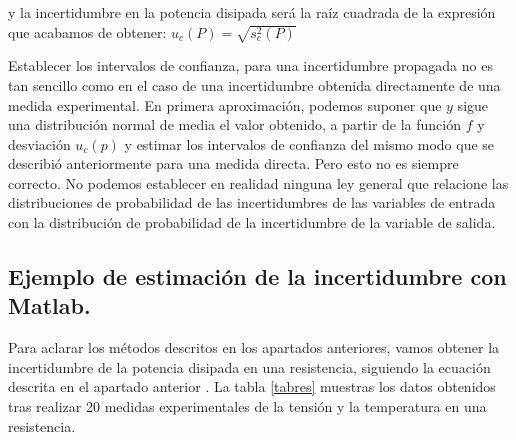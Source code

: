 y la incertidumbre en la potencia disipada será la raíz cuadrada de la expresión que acabamos de obtener: $u_c(P) =\sqrt{s_c^2(P)} $

Establecer los intervalos de confianza, para una incertidumbre propagada no es tan sencillo como en el caso de una incertidumbre obtenida directamente de una medida experimental. En primera aproximación, podemos suponer que $y$ sigue una distribución normal de media el valor obtenido, a partir de la función $f$ y desviación $u_c(p)$ y estimar los intervalos de confianza del mismo modo que se describió anteriormente para una medida directa.  Pero esto no es siempre correcto. No podemos establecer en realidad ninguna ley general que relacione las distribuciones de probabilidad de las incertidumbres de las variables de entrada con la distribución de probabilidad de la incertidumbre de la variable de salida.

\subsection{Ejemplo de estimación de la incertidumbre con Matlab.}

Para aclarar los métodos descritos en los apartados anteriores, vamos obtener la incertidumbre de la potencia disipada en una resistencia, siguiendo la ecuación descrita en el apartado anterior . La tabla \ref{tabres} muestras los datos obtenidos tras realizar 20 medidas experimentales de la tensión y la temperatura en una resistencia.

